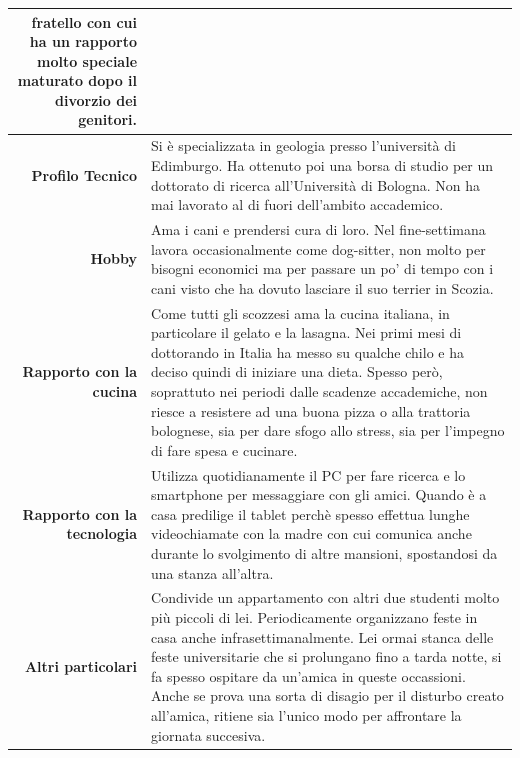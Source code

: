 \begin{table}[H]
\begin{centering}
\begin{tabular} { | r  p{10cm} | }
{fratello con cui ha un rapporto molto speciale maturato dopo il
divorzio dei genitori.} \\
\hline
		\textbf{Profilo Tecnico} & Si è specializzata in geologia presso
l'università di Edimburgo. Ha ottenuto poi una borsa di studio per un
dottorato di ricerca all'Università di Bologna. Non ha mai lavorato al
di fuori dell'ambito accademico.\\ \hline
		\textbf{Hobby} & Ama i cani e prendersi cura di loro. Nel
fine-settimana lavora occasionalmente come dog-sitter, non molto per
bisogni economici ma per passare un po' di tempo con i cani visto che ha
dovuto lasciare il suo terrier in Scozia. \\\hline
		\textbf{Rapporto con la cucina} & Come tutti gli scozzesi ama
la cucina italiana, in particolare il gelato e la lasagna. Nei
primi mesi di dottorando in Italia ha messo su qualche chilo e ha deciso
quindi di iniziare una dieta. Spesso però, soprattuto nei periodi dalle
scadenze accademiche, non riesce a resistere ad una buona pizza o alla
trattoria bolognese,
sia per dare sfogo allo stress, sia per l'impegno di fare spesa e
cucinare.\\ \hline
		\textbf{Rapporto con la tecnologia} & Utilizza quotidianamente
il PC per fare ricerca e lo smartphone per messaggiare con gli amici.
Quando è a casa predilige il tablet perchè spesso effettua lunghe
videochiamate con la madre con cui comunica anche durante lo svolgimento
di altre mansioni, spostandosi da una stanza all'altra.\\ \hline
		\textbf{Altri particolari} & Condivide un appartamento con altri
due studenti molto più piccoli di lei. Periodicamente organizzano feste
in casa anche infrasettimanalmente. Lei ormai stanca delle feste
universitarie che si prolungano fino a tarda notte, si fa spesso ospitare
da un'amica in queste occassioni. Anche se prova una sorta di disagio per il
disturbo creato all'amica, ritiene sia l'unico modo per affrontare la giornata
succesiva.\\ \hline
	\end{tabular}
	\end{centering}
\end{table}

